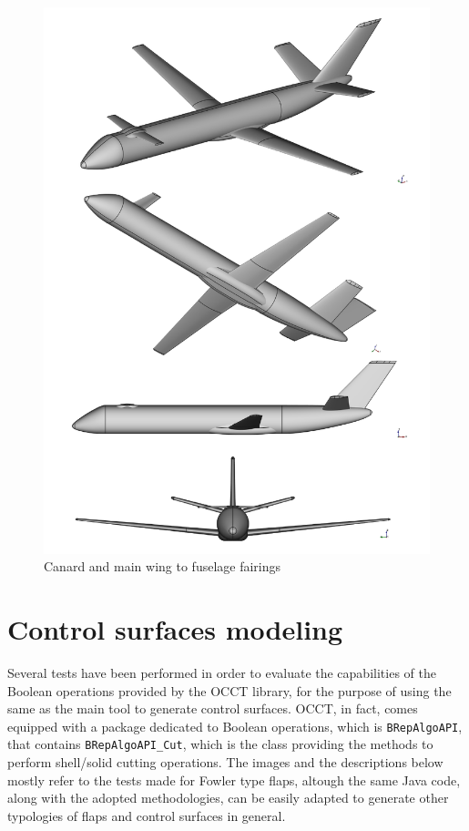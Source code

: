\begin{figure}[H]
\centering
\includegraphics[scale=0.80]{Immagini/Appendice/Fairing/fairing_05}
\caption{Canard and main wing to fuselage fairings}
\label{fig:AircraftFairings}
\end{figure}
%  

\section{Control surfaces modeling}
\label{secApp1A2}

Several tests have been performed in order to evaluate the capabilities of the Boolean operations provided by the \gls{OCCT} library, for the purpose of using the same as the main tool to generate control surfaces. \gls{OCCT}, in fact, comes equipped with a package dedicated to Boolean operations, which is \lstinline[language=Java]!BRepAlgoAPI!, that contains \lstinline[language=Java]!BRepAlgoAPI_Cut!, which is the class providing the methods to perform shell/solid cutting operations. The images and the descriptions below mostly refer to the tests made for Fowler type flaps, altough the same Java code, along with the adopted methodologies, can be easily adapted to generate other typologies of flaps and control surfaces in general.

